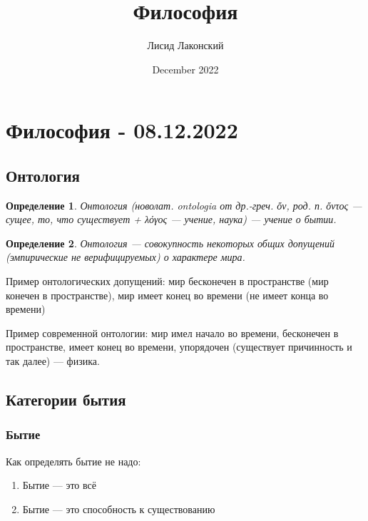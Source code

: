 \documentclass{article}
\title{Философия}
\author{Лисид Лаконский}
\date{December 2022}
\newtheorem{definition}{Определение}
\begin{document}
\maketitle
\tableofcontents
\pagebreak

\section{Философия - 08.12.2022}

\subsection{Онтология}

\begin{flushleft}

\begin{definition}
Онтология (новолат. ontologia от др.-греч. \textgreek{ὄν}, род. п. \textgreek{ὄντος} — сущее, то, что существует + \textgreek{λόγος} — учение, наука) — учение о бытии.
\end{definition}

\begin{definition}
Онтология — совокупность некоторых общих допущений (эмпирические не верифицируемых) о характере мира.
\end{definition}

Пример онтологических допущений: мир бесконечен в пространстве (мир конечен в пространстве), мир имеет конец во времени (не имеет конца во времени)

Пример современной онтологии: мир имел начало во времени, бесконечен в пространстве, имеет конец во времени, упорядочен (существует причинность и так далее) — физика.

\subsection{Категории бытия}

\subsubsection{Бытие}

Как определять бытие не надо:

\begin{enumerate}
    \item Бытие — это всё
    \item Бытие — это способность к существованию
\end{enumerate}


\end{flushleft}
\end{document}
